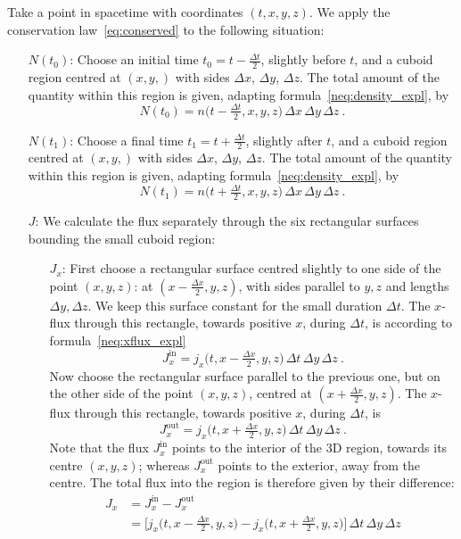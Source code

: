 \documentclass[a4paper,12pt,%
onecolumn,oneside,titlepage,%
british%
]{memoir}
\newcommand*{\incr}{\Delta}%
\renewcommand*{\|}[1][]{\nonscript\:#1\vert\nonscript\:\mathopen{}}
\newcommand*{\yti}{t_{0}}
\newcommand*{\ytf}{t_{1}}
\newcommand*{\Dt}{\incr t}
\newcommand*{\Dx}{\incr x}
\newcommand*{\Dy}{\incr y}
\newcommand*{\Dz}{\incr z}
\newcommand*{\Dth}{\tfrac{\incr t}{2}}
\newcommand*{\Dxh}{\tfrac{\incr x}{2}}
\newcommand*{\yN}{N}
\newcommand*{\yJ}{J}
\begin{document}
Take a point in spacetime with coordinates $(t,x,y,z)$. We apply the conservation law~\eqref{eq:conserved} to the following situation:
\begin{itemize}
\item[$\yN(\yti)$:] Choose an initial time $\yti=t-\Dth$, slightly before $t$, and a cuboid region centred at $(x,y,)$ with sides $\Dx$, $\Dy$, $\Dz$. The total amount of the quantity within this region is given, adapting formula~\eqref{neq:density_expl}, by
  \begin{equation}
    \label{neq:C1dens}
    \yN(\yti) = n\bigl(t-\Dth, x,y,z\bigr)\,\Dx\,\Dy\,\Dz \ .
  \end{equation}

\item[$\yN(\ytf)$:] Choose a final time $\ytf = t+\Dth$, slightly after $t$, and a cuboid region centred at $(x,y,)$ with sides $\Dx$, $\Dy$, $\Dz$. The total amount of the quantity within this region is given, adapting formula~\eqref{neq:density_expl}, by
  \begin{equation}
    \label{neq:C2dens}
    \yN(\ytf) = n\bigl(t+\Dth, x,y,z\bigr)\,\Dx\,\Dy\,\Dz \ .
  \end{equation}

\item[$\yJ$:] We calculate the flux separately through the six rectangular surfaces bounding the small cuboid region:
  \begin{itemize}
  \item[$\yJ_{x}$:] First choose a rectangular surface centred slightly to one side of the point $(x,y,z)$: at $(x-\Dxh, y, z)$, with sides parallel to $y,z$ and lengths $\Dy, \Dz$. We keep this surface constant for the small duration $\Dt$. The $x$-flux through this rectangle, towards positive $x$, during $\Dt$, is according to formula~\eqref{neq:xflux_expl}
    \begin{equation*}
      \label{neq:Fxfluxn}
     \yJ_{x}^{\text{in}} = j_{x}\bigl(t, x-\Dxh, y, z\bigr)\,\Dt\,\Dy\,\Dz \ .
    \end{equation*}
    Now choose the rectangular surface parallel to the previous one, but on the other side of the point $(x,y,z)$, centred at $(x+\Dxh, y, z)$. The $x$-flux through this rectangle, towards positive $x$, during $\Dt$, is
    \begin{equation*}
      \label{neq:Fxfluxp}
      \yJ_{x}^{\text{out}} = j_{x}\bigl(t, x+\Dxh, y, z\bigr)\,\Dt\,\Dy\,\Dz \ .
    \end{equation*}
    Note that the flux $\yJ_{x}^{\text{in}}$ points to the interior of the 3D region, towards its centre $(x,y,z)$; whereas $\yJ_{x}^{\text{out}}$ points to the exterior, away from the centre. The total flux into the region is therefore given by their difference:
    \begin{equation}
      \label{neq:Fxflux}
      \begin{split}
        \yJ_{x} &= \yJ_{x}^{\text{in}} - \yJ_{x}^{\text{out}}
        \\&= \bigl[ j_{x}\bigl(t, x-\Dxh, y, z\bigr) - j_{x}\bigl(t, x+\Dxh, y, z\bigr)\bigr]
        \,\Dt\,\Dy\,\Dz
      \end{split}
    \end{equation}


\end{itemize}
\end{itemize}
\end{document}
